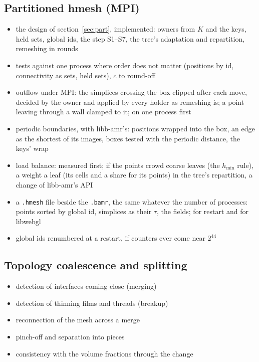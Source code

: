\documentclass[10pt,a4paper]{article}
\theoremstyle{definition}
\newcommand{\fn}[1]{\texttt{#1}}
\begin{document}
\subsection*{Partitioned hmesh (MPI)}
\begin{itemize}
  \item the design of section~\ref{sec:part}, implemented: owners from
    $K$ and the keys, held sets, global ids, the step S1--S7, the tree's
    adaptation and repartition, remeshing in rounds
  \item tests against one process where order does not matter (positions
    by id, connectivity as sets, held sets), $c$ to round-off
  \item outflow under MPI: the simplices crossing the box clipped after
    each move, decided by the owner and applied by every holder as
    remeshing is; a point leaving through a wall clamped to it; on one
    process first
  \item periodic boundaries, with libb-amr's: positions wrapped into the
    box, an edge as the shortest of its images, boxes tested with the
    periodic distance, the keys' wrap
  \item load balance: measured first; if the points crowd coarse leaves
    (the $h_{\min}$ rule), a weight a leaf (its cells and a share for its
    points) in the tree's repartition, a change of libb-amr's API
  \item a \fn{.hmesh} file beside the \fn{.bamr}, the same whatever the
    number of processes: points sorted by global id, simplices as their
    $\tau$, the fields; for restart and for libwebgl
  \item global ids renumbered at a restart, if counters ever come near
    $2^{44}$
\end{itemize}

\subsection*{Topology coalescence and splitting}
\begin{itemize}
  \item detection of interfaces coming close (merging)
  \item detection of thinning films and threads (breakup)
  \item reconnection of the mesh across a merge
  \item pinch-off and separation into pieces
  \item consistency with the volume fractions through the change
\end{itemize}
\end{document}
